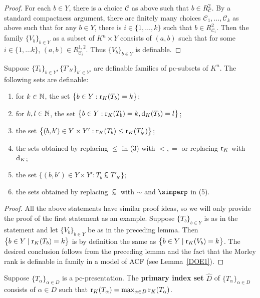 \begin{proof}
For each $b \in Y$, there is a choice $\mathscr{C}$ as above such that $b \in R^2_{\mathscr{C}}$. By a standard compactness argument, there are finitely many choices $\mathscr{C}_1, \ldots, \mathscr{C}_k$ as above such that for any $b \in Y$, there is $i \in \{ 1, \ldots, k\} $ such that $b \in R^2_{\mathscr{C}_i}$. Then the family $\{V_b\}_{b \in Y}$ as a subset of $K^n \times Y$ consists of $(a, b)$ such that for some $i \in \{1, \ldots k\}$, $(a, b) \in R^{1,2}_{\mathscr{C}_i}$.  Thus $\{V_b\}_{b \in Y}$ is definable.
\end{proof}

\begin{cor} \label{Definability}
Suppose $\{T_b\}_{b \in Y}, \{T'_{b'}\}_{b' \in Y'}$ are definable families of pc-subsets of $K^n$. The following sets are definable:
\begin{enumerate}
\item for $k \in \mathbb{N}$, the set $\big\{ b \in Y : \mathrm{r}_K(T_b) = k \big\}$;
\item for $k,l \in \mathbb{N}$, the set $\big\{ b \in Y : \mathrm{r}_K(T_b) = k,  \mathrm{d}_K(T_b) = l \big\}$;
\item the set $ \big\{ (b,b') \in Y \times Y' : \mathrm{r}_K(T_b) \leq \mathrm{r}_K( T'_{b'}) \big\}$;
\item the sets obtained by replacing $\leq$ in (3) with $<, =$ or replacing $\mathrm{r}_K$ with $\mathrm{d}_K$;
\item the set $ \big\{ (b,b') \in Y \times Y' : T_b \subsim T'_{b'} \big\}$;
\item the sets obtained by replacing $ \subsim$ with $\sim$ and $\simperp$ in (5). 
\end{enumerate}
\end{cor}

\begin{proof}
All the above statements have similar proof ideas, so we will only provide the proof of the first statement as an example. Suppose $\{T_b\}_{b \in Y}$ is as in the statement and let $\{V_b\}_{b \in Y}$ be as in the preceding lemma. Then $\big\{ b \in Y \mid \mathrm{r}_K(T_b) = k \big\}$ is by definition the same as $\big\{ b \in Y \mid \mathrm{r}_K(V_b) = k \big\}$. The desired conclusion follows from the preceding lemma and the fact that the Morley rank is definable in family in a model of ACF (see Lemma~\ref{DOE1}).
\end{proof}

\noindent
Suppose $\{T_\alpha\}_{\alpha \in D}$ is a pc-presentation. The {\bf primary index set} $\hat{D}$ of $\{T_\alpha\}_{\alpha \in D}$ consists of   $\alpha \in D$ such that $\mathrm{r}_K(T_\alpha) = \max_{ \alpha \in D} \mathrm{r}_K(T_\alpha)$.

